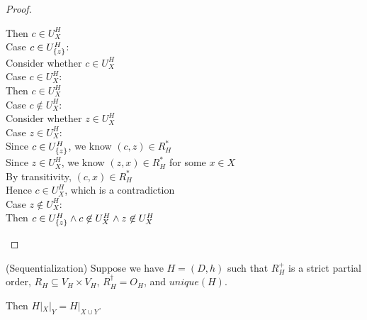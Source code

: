 \begin{proof}
\begin{tabbedproof}
\oooo Then $c \in U^H_{X}$ \\
\ooo Case $c \in U^H_{\{{z}\}}$: \\ 
\oooo Consider whether $c \in U^H_{X}$ \\
\oooo Case $c \in U^H_{X}$: \\
\ooooo Then $c \in U^H_{X}$ \\
\oooo Case $c \not\in U^H_{X}$: \\
\ooooo Consider whether $z \in U^H_{X}$ \\
\ooooo Case $z \in U^H_{X}$: \\
\oooooo Since $c \in U^H_{\{{z}\}}$, we know $(c, z) \in R^*_H$ \\
\oooooo Since $z \in U^H_{X}$, we know $(z, x) \in R^*_H$ for some $x \in X$ \\
\oooooo By transitivity, $(c, x) \in R^*_H$  \\
\oooooo Hence $c \in U^H_{X}$, which is a contradiction \\
\ooooo Case $z \not\in U^H_{X}$: \\
\oooooo Then $c \in U^H_{\{{z}\}} \land c \not\in U^H_{X} \land z \not\in U^H_{X}$ \\
\end{tabbedproof}
\end{proof}

\begin{lemma}{(Sequentialization)}
Suppose we have $H = (D,h)$ such that $R^+_H$ is a strict partial
order, $R_H \subseteq V_H \times V_H$, $R^\dagger_H = O_H$, and
$\mathit{unique}(H)$.

Then $H|_X|_Y = H|_{X \cup Y}$.
\end{lemma}

